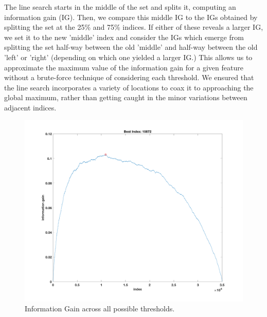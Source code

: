 The line search starts in the middle of the set and splits it, computing an information gain (IG). Then, we compare this middle IG to the IGs obtained by splitting the set at the 25\% and 75\% indices. If either of these reveals a larger IG, we set it to the new 'middle' index and consider the IGs which emerge from splitting the set half-way between the old 'middle' and half-way between the old 'left' or 'right' (depending on which one yielded a larger IG.) This allows us to approximate the maximum value of the information gain for a given feature without a brute-force technique of considering each threshold. We ensured that the line search incorporates a variety of locations to coax it to approaching the global maximum, rather than getting caught in the minor variations between adjacent indices.  
%
\begin{figure}[H]
  \centering\includegraphics[width=0.6\columnwidth]{../images/IG}
  \caption{Information Gain across all possible thresholds.}
  \label{fig:IG}
\end{figure}

